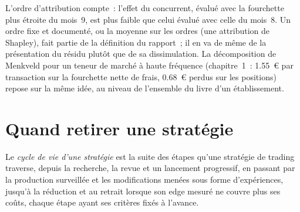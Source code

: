 \begin{omfigure}

\label{fig:hf:pnl-analytics-and-the-strategy-lifecycle:month9}
\end{omfigure}

L'ordre d'attribution compte~: l'effet du concurrent, évalué avec la fourchette plus étroite du mois~9, est plus faible que celui évalué avec celle du mois~8.
Un ordre fixe et documenté, ou la moyenne sur les ordres (une attribution de Shapley), fait partie de la définition du rapport~; il en va de même de la présentation du résidu plutôt que de sa dissimulation.
La décomposition de Menkveld pour un teneur de marché à haute fréquence (chapitre~1~: 1.55~\euro{} par transaction sur la fourchette nette de frais, 0.68~\euro{} perdus sur les positions) repose
sur la même idée, au niveau de l'ensemble du livre d'un établissement.

\section{Quand retirer une stratégie}

\begin{definition}\label{def:hf:pnl-analytics-and-the-strategy-lifecycle:lifecycle}
Le \emph{cycle de vie d'une stratégie} est la suite des étapes qu'une stratégie de trading traverse, depuis la recherche, la revue et un lancement progressif,
en passant par la production surveillée et les modifications menées sous forme d'expériences, jusqu'à la réduction et au retrait lorsque son edge mesuré ne couvre plus ses coûts, chaque
étape ayant ses critères fixés à l'avance.
\end{definition}

